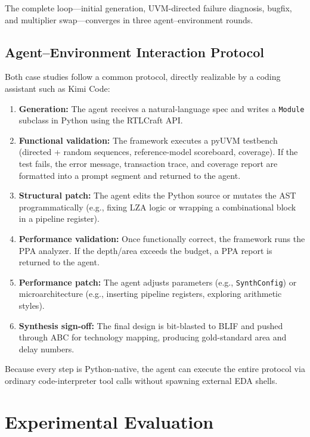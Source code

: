 \documentclass[11pt]{article}
\begin{document}
The complete loop---initial generation, UVM-directed failure diagnosis, bugfix, and multiplier swap---converges in three agent--environment rounds.

\subsection{Agent--Environment Interaction Protocol}
\label{sec:protocol}

Both case studies follow a common protocol, directly realizable by a coding assistant such as Kimi Code:

\begin{enumerate}
    \item \textbf{Generation:} The agent receives a natural-language spec and writes a \texttt{Module} subclass in Python using the RTLCraft API.
    \item \textbf{Functional validation:} The framework executes a pyUVM testbench (directed + random sequences, reference-model scoreboard, coverage). If the test fails, the error message, transaction trace, and coverage report are formatted into a prompt segment and returned to the agent.
    \item \textbf{Structural patch:} The agent edits the Python source or mutates the AST programmatically (e.g., fixing LZA logic or wrapping a combinational block in a pipeline register).
    \item \textbf{Performance validation:} Once functionally correct, the framework runs the PPA analyzer. If the depth/area exceeds the budget, a PPA report is returned to the agent.
    \item \textbf{Performance patch:} The agent adjusts parameters (e.g., \texttt{SynthConfig}) or microarchitecture (e.g., inserting pipeline registers, exploring arithmetic styles).
    \item \textbf{Synthesis sign-off:} The final design is bit-blasted to BLIF and pushed through ABC for technology mapping, producing gold-standard area and delay numbers.
\end{enumerate}

Because every step is Python-native, the agent can execute the entire protocol via ordinary code-interpreter tool calls without spawning external EDA shells.

\section{Experimental Evaluation}
\label{sec:experiments}
\end{document}
